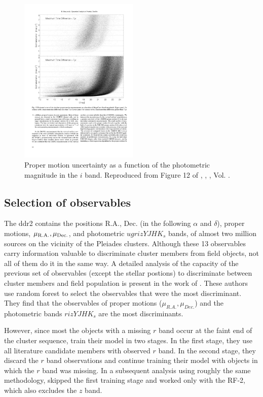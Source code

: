 \begin{figure}[ht!]
\begin{center}
\includegraphics[height=8cm]{background/Figures/F12_Bouy2013.pdf}
\caption{Proper motion uncertainty as a function of the photometric magnitude in the $i$ band. Reproduced from Figure 12 of \citet{Bouy2013}, \textit{}, , Vol. .}
\label{fig:pmuncert}
\end{center}
\end{figure}

\subsection{Selection of observables}
\label{sect:RF-2}
\sloppy
The \gls{ddr2} contains the positions R.A., Dec. (in the following $\alpha$ and $\delta$), proper motions, $\mu_{\rm{R.A.}},\mu_{\rm{Dec.}}$, and photometric $ugrizYJHK_s$ bands, of almost two million sources on the vicinity of the Pleiades clusters. Although these 13 observables carry information valuable to discriminate cluster members from field objects, not all of them do it in the same way. A detailed analysis of the capacity of the previous set of observables (except the stellar postions) to discriminate between cluster members and field population is present in the work of \citet{Sarro2014}. These authors use random forest to select the observables that were the most discriminant. They find that the observables of  proper motions ($\mu_{R.A.},\mu_{Dec.}$) and the photometric bands $rizYJHK_s$ are the most discriminants. 

However, since most the objects with a missing $r$ band occur at the faint end of the cluster sequence, \citet{Sarro2014} train their model in two stages. In the first stage, they use all literature candidate members with observed $r$ band. In the second stage, they discard the $r$ band observations and continue training their model with objects in which the $r$ band was missing.  In a subsequent analysis using roughly the same methodology, \citet{Bouy2015} skipped the first training stage and worked only with the RF-2, which also excludes the $z$ band.

